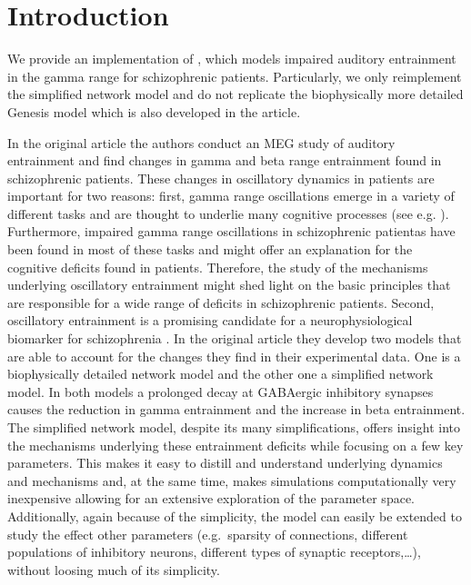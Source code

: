 \documentclass[10pt,a4paper,onecolumn]{article}
\begin{document}
\section{Introduction}\label{introduction}

We provide an implementation of \autocite{Vierling2008}, which models
impaired auditory entrainment in the gamma range for schizophrenic
patients. Particularly, we only reimplement the simplified network model
and do not replicate the biophysically more detailed Genesis model which
is also developed in the article.

In the original article the authors conduct an MEG study of auditory
entrainment and find changes in gamma and beta range entrainment found
in schizophrenic patients. These changes in oscillatory dynamics in
patients are important for two reasons: first, gamma range oscillations
emerge in a variety of different tasks and are thought to underlie many
cognitive processes (see e.g. \autocite{Fries2005,Fries2015}). Furthermore, impaired gamma
range oscillations in schizophrenic patientas have been found in most of
these tasks and might offer an explanation for the cognitive deficits
found in patients. Therefore, the study of the mechanisms underlying
oscillatory entrainment might shed light on the basic principles that
are responsible for a wide range of deficits in schizophrenic patients.
Second, oscillatory entrainment is a promising candidate for a
neurophysiological biomarker for schizophrenia
\autocite{Siekmeier2015}. In the original article they develop two
models that are able to account for the changes they find in their
experimental data. One is a biophysically detailed network model and the
other one a simplified network model. In both models a prolonged decay
at GABAergic inhibitory synapses causes the reduction in gamma
entrainment and the increase in beta entrainment. The simplified network
model, despite its many simplifications, offers insight into the
mechanisms underlying these entrainment deficits while focusing on a few
key parameters. This makes it easy to distill and understand underlying
dynamics and mechanisms and, at the same time, makes simulations
computationally very inexpensive allowing for an extensive exploration
of the parameter space. Additionally, again because of the simplicity,
the model can easily be extended to study the effect other parameters
(e.g.~sparsity of connections, different populations of inhibitory
neurons, different types of synaptic receptors,\ldots{}), without
loosing much of its simplicity.
\end{document}
